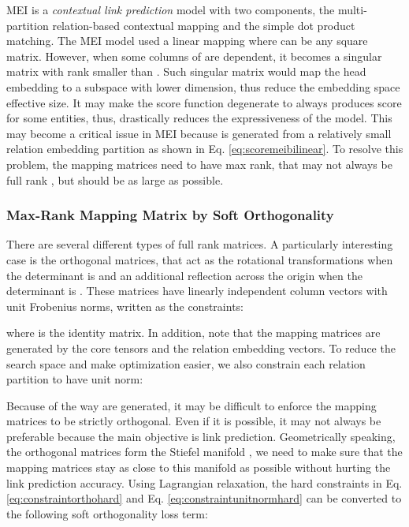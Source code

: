 \documentclass{article}
\theoremstyle{plain}
\theoremstyle{remark}
\begin{document}
MEI is a \textit{contextual link prediction} model with two components, the multi-partition relation-based contextual mapping and the simple dot product matching. The MEI model used a linear mapping where  can be any  square matrix. However, when some columns of  are dependent, it becomes a singular matrix with rank smaller than . Such singular matrix would map the head embedding to a subspace with lower dimension, thus reduce the embedding space effective size. It may make the score function degenerate to always produces score  for some entities, thus, drastically reduces the expressiveness of the model. This may become a critical issue in MEI because  is generated from a relatively small relation embedding partition  as shown in Eq. \ref{eq:scoremeibilinear}. To resolve this problem, the mapping matrices  need to have max rank, that may not always be full rank , but should be as large as possible. 

\subsubsection{Max-Rank Mapping Matrix by Soft Orthogonality}
There are several different types of full rank matrices. A particularly interesting case is the orthogonal matrices, that act as the rotational transformations when the determinant is  and an additional reflection across the origin when the determinant is . These matrices have linearly independent column vectors with unit Frobenius norms, written as the constraints:

where  is the identity matrix. In addition, note that the mapping matrices are generated by the core tensors and the relation embedding vectors. To reduce the search space and make optimization easier, we also constrain each relation partition  to have unit norm:


Because of the way  are generated, it may be difficult to enforce the mapping matrices to be strictly orthogonal. Even if it is possible, it may not always be preferable because the main objective is link prediction. Geometrically speaking, the orthogonal matrices form the Stiefel manifold \cite{sokol_informationgeometryorthogonal_2020}, we need to make sure that the mapping matrices stay as close to this manifold as possible without hurting the link prediction accuracy. Using Lagrangian relaxation, the hard constraints in Eq. \ref{eq:constraintorthohard} and Eq. \ref{eq:constraintunitnormhard} can be converted to the following soft orthogonality loss term:
\end{document}
